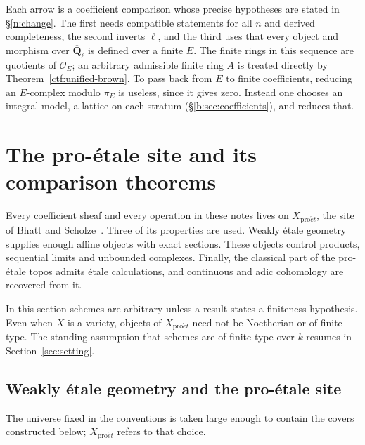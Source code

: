 \documentclass[11pt,a4paper]{article}
\numberwithin{equation}{section}
\theoremstyle{definition}
\theoremstyle{remark}
\newcommand{\Qbar}{\overline{\mathbf Q}_\ell}
\newcommand{\proet}{\mathrm{pro}\acute{e}t}
\begin{document}
Each arrow is a coefficient comparison whose precise hypotheses are
stated in \S\ref{n:change}. The first needs compatible statements for
all $n$ and derived completeness, the second inverts $\ell$, and the
third uses that every object and morphism over $\Qbar$ is defined over
a finite $E$. The finite rings in this sequence are quotients of
$\mathcal O_E$; an arbitrary admissible finite ring $A$ is treated
directly by Theorem~\ref{ctf:unified-brown}.
To pass back from $E$ to finite coefficients, reducing an $E$-complex
modulo $\pi_E$ is useless, since it gives zero. Instead one chooses an
integral model, a lattice on each stratum (\S\ref{b:sec:coefficients}),
and reduces that.

\section{The pro-\'etale site and its comparison theorems}
\label{sec:proetale-foundations}

Every coefficient sheaf and every operation in these notes lives on
$X_{\proet}$, the site of Bhatt and Scholze~\cite{BS}. Three of its
properties are used. Weakly \'etale geometry supplies enough affine
objects with exact sections. These objects control products, sequential
limits and unbounded complexes. Finally, the classical part of the
pro-\'etale topos admits \'etale calculations, and continuous and adic
cohomology are recovered from it.

In this section schemes are arbitrary unless a result states a
finiteness hypothesis. Even when $X$ is a variety, objects of
$X_{\proet}$ need not be Noetherian or of finite type. The standing
assumption that schemes are of finite type over $k$ resumes in
Section~\ref{sec:setting}.

\subsection{Weakly \'etale geometry and the pro-\'etale site}
\label{pe:local-site}

The universe fixed in the conventions is taken large enough to contain
the covers constructed below; $X_{\proet}$ refers to that choice.
\end{document}
